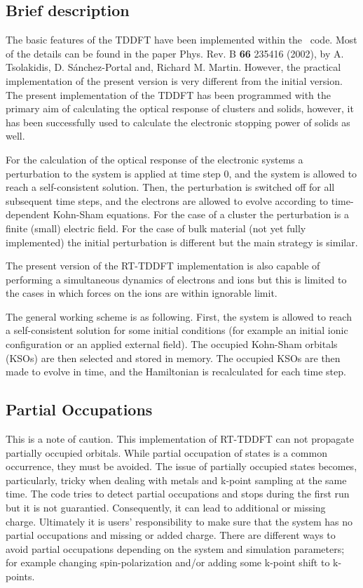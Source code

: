 \subsection{Brief description}
The basic features of the TDDFT have been implemented 
within the \siesta\ code. Most of the 
details can be found in the paper Phys. Rev. B
\textbf{66} 235416 (2002), by A. Tsolakidis,
D. S\'anchez-Portal and, Richard M. Martin.
However, the practical implementation of the present version 
is very different 
from the initial version. The present implementation of the TDDFT has been 
programmed with the primary aim of calculating the optical 
response of clusters and solids, however, it has been successfully used to
calculate the electronic stopping power of solids as well.
 
For the calculation of the optical response of the electronic
systems a perturbation 
to the system is applied at time step 0, and the system is 
allowed to reach a self-consistent solution. Then, the perturbation 
is switched off for all subsequent time steps, and the electrons
are allowed to evolve according to time-dependent Kohn-Sham
equations. For the case of a cluster the perturbation 
is a finite (small) electric field. For the case of bulk 
material (not yet fully implemented) the initial perturbation
is different but the main strategy is similar.

The present version of the RT-TDDFT implementation is also capable of
performing a simultaneous  dynamics of electrons and
ions but this is limited to the cases in which forces on the ions are within
ignorable limit.

The general working scheme is as following. First, the system is
allowed to reach a self-consistent solution for some initial
conditions (for example an initial ionic configuration or an applied
external field). The occupied Kohn-Sham orbitals (KSOs) are then selected
and stored in memory.  The occupied KSOs are then made to evolve in
time, and the Hamiltonian is recalculated for each time step.

\subsection{Partial Occupations}

This is a note of caution. This implementation of RT-TDDFT can not propagate partially occupied orbitals. While partial occupation of states is a common occurrence, they must be avoided. The issue of partially occupied states becomes, particularly,  tricky when dealing with metals and k-point sampling at the same time. The code tries to detect partial occupations and stops during the first run but it is not guarantied. Consequently, it can lead to additional or missing charge. Ultimately it is users' responsibility to make sure that the system has no partial occupations and missing or added charge. There are different ways to avoid partial occupations depending on the system and simulation parameters; for example changing spin-polarization and/or adding some k-point shift to k-points.

